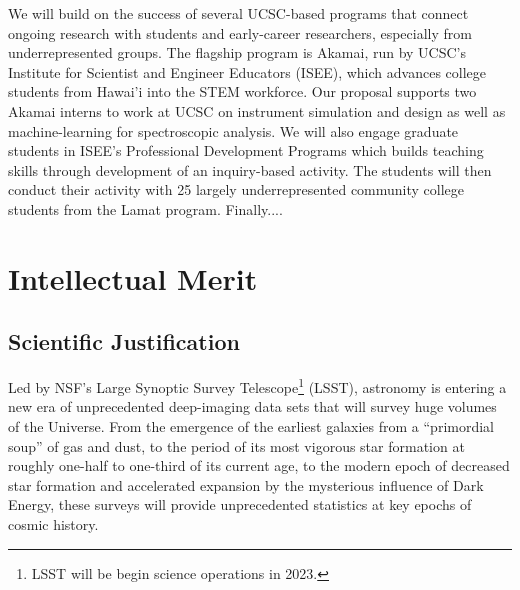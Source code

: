 \documentclass[oneside,11pt]{amsart}
\begin{document}
 We will build on the success of several UCSC-based programs that connect ongoing
research with students and early-career researchers, especially from underrepresented groups.  The flagship program is
Akamai, run by UCSC's Institute for Scientist and Engineer Educators (ISEE), which advances college
students from Hawai'i into the STEM workforce.  Our proposal supports two Akamai interns to work at UCSC on instrument
simulation and design as well as machine-learning for spectroscopic analysis.  We will also engage graduate students in
ISEE's Professional Development Programs which builds teaching skills through development of an inquiry-based
activity.  The students will then conduct their activity with 25 largely underrepresented community college students
from the Lamat program.  Finally....

\clearpage
\setcounter{page}{1}

\noindent{}

\section{Intellectual Merit}
\label{sec:im}

\subsection{Scientific Justification} 

Led by NSF's Large Synoptic Survey Telescope\footnote{
%
LSST will be begin science operations in 2023.}
%
(LSST), astronomy is entering a new era of unprecedented deep-imaging
data sets that will survey huge volumes of the Universe.  From the
emergence of the earliest galaxies from a ``primordial soup'' of gas and
dust, to the period of its most vigorous star formation at roughly
one-half to one-third of its current age, to the modern epoch of
decreased star formation and accelerated expansion by the mysterious
influence of Dark Energy, these surveys will provide unprecedented
statistics at key epochs of cosmic history.
\end{document}
